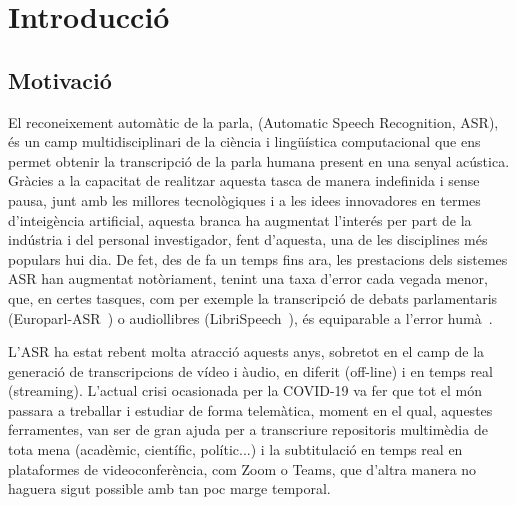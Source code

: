 
\chapter{Introducció}
\label{cap01__}


\section{Motivació}
\label{cap01_motivacio}

El reconeixement automàtic de la parla, (Automatic Speech Recognition, ASR), és un camp multidisciplinari de la ciència i lingüística computacional que ens permet obtenir la transcripció de la parla humana present en una senyal acústica.
Gràcies a la capacitat de realitzar aquesta tasca de manera indefinida i sense pausa, junt amb les millores tecnològiques i a les idees innovadores en termes d'inte\lgem igència artificial, aquesta branca ha augmentat l'interés per part de la indústria i del personal investigador, fent d'aquesta, una de les disciplines més populars hui dia.
De fet, des de fa un temps fins ara, les prestacions dels sistemes ASR han augmentat notòriament, tenint una taxa d'error cada vegada menor, que, en certes tasques, com per exemple la transcripció de debats parlamentaris (Europarl-ASR~\cite{diazmunio21_interspeech}) o audiollibres (LibriSpeech~\cite{https://doi.org/10.48550/arxiv.2204.10586}), és equiparable a l'error humà~\cite{https://doi.org/10.48550/arxiv.2203.12668}.


L'ASR ha estat rebent molta atracció aquests anys, sobretot en el camp de la generació de transcripcions de vídeo i àudio, en diferit (off-line) i en temps real (streaming). L'actual crisi ocasionada per la COVID-19 va fer que tot el món passara a treballar i estudiar de forma telemàtica, moment en el qual, aquestes ferramentes, van ser de gran ajuda per a transcriure repositoris multimèdia de tota mena (acadèmic, científic, polític...) i la subtitulació en temps real en plataformes de videoconferència, com Zoom o Teams, que d'altra manera no haguera sigut possible amb tan poc marge temporal.

